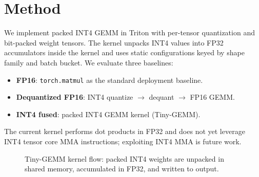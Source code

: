 \section{Method}
We implement packed INT4 GEMM in Triton with per-tensor quantization and
bit-packed weight tensors. The kernel unpacks INT4 values into FP32 accumulators
inside the kernel and uses static configurations keyed by shape family and batch
bucket. We evaluate three baselines:

\begin{itemize}[leftmargin=*,itemsep=0.2em,topsep=0.2em]
  \item \textbf{FP16}: \texttt{torch.matmul} as the standard deployment baseline.
  \item \textbf{Dequantized FP16}: INT4 quantize $\rightarrow$ dequant $\rightarrow$ FP16 GEMM.
  \item \textbf{INT4 fused}: packed INT4 GEMM kernel (Tiny-GEMM).
\end{itemize}

The current kernel performs dot products in FP32 and does not yet leverage
INT4 tensor core MMA instructions; exploiting INT4 MMA is future work.

\begin{figure}[h]
  \centering
  \resizebox{\linewidth}{!}{}
  \caption{Tiny-GEMM kernel flow: packed INT4 weights are unpacked in shared memory, accumulated in FP32, and written to output.}
  \label{fig:arch}
\end{figure}
